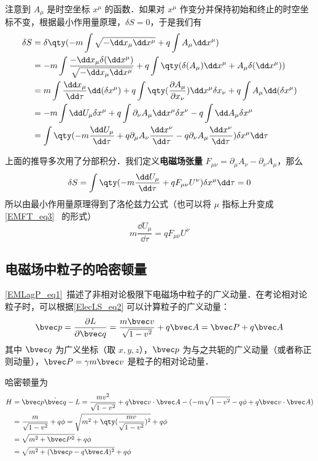 注意到 $A_\mu$ 是时空坐标 $x^\mu$ 的函数．如果对 $x^\mu$ 作变分并保持初始和终止的时空坐标不变，根据最小作用量原理，$\delta S=0$，于是我们有
\begin{equation}
\begin{aligned}
\delta S&=\delta\qty( -m\int \sqrt{-\dd x_\mu \dd x^\mu} +q\int A_\mu \dd x^\mu)\\
&=-m\int \frac{-\dd x_\mu \delta (\dd x^\mu)}{\sqrt{-\dd x_\mu \dd x^\mu}}+q\int \qty(\delta(A_\mu)\dd x^\mu + A_\mu \delta(\dd x^\mu))\\
&=m\int \frac{\dd x_\mu}{\dd \tau}\dd(\delta x^\mu)+q\int\qty(\frac{\partial A_\mu}{\partial x_\nu})\dd x^\mu \delta x_\nu+q\int A_\mu \dd(\delta x^\mu)\\
&=-m\int\dd U_\mu \delta x^\mu+q\int \partial_\nu A_\mu \dd x^\mu\delta x^\nu-q\int \dd A_\mu \delta x^\mu\\
&=\int \qty(-m\frac{\dd U_\mu}{\dd \tau} + q\partial_\mu A_\nu \frac{\dd x^\nu}{\dd \tau}-q\partial_\nu A_\mu\frac{\dd x^\nu}{\dd \tau})\delta x^\mu\dd \tau\\
\end{aligned}
\end{equation}

上面的推导多次用了分部积分．我们定义\textbf{电磁场张量} $F_{\mu\nu}=\partial_{\mu}A_\nu-\partial_\nu A_\mu$，那么
\begin{equation}
\delta S=\int\qty(-m\frac{\dd U_\mu}{\dd \tau}+qF_{\mu\nu}U^\nu)\delta x^\mu \dd \tau=0
\end{equation}
所以由最小作用量原理得到了洛伦兹力公式（也可以将 $\mu$ 指标上升变成 \autoref{EMFT_eq3}~ 的形式）
\begin{equation}
m\frac{\dd U_\mu}{\dd \tau}=qF_{\mu\nu} U^\nu
\end{equation}

\subsection{电磁场中粒子的哈密顿量}
\autoref{EMLagP_eq1}~描述了非相对论极限下电磁场中粒子的广义动量．在考论相对论粒子时，可以根据\autoref{ElecLS_eq2} 可以计算粒子的广义动量：
\begin{equation}
\bvec p=\frac{\partial L}{\partial \dot {\bvec q}}=\frac{m\bvec v}{\sqrt{1-v^2}}+q\bvec A=\bvec P+q\bvec A
\end{equation}
其中 $\bvec q$ 为广义坐标（取 $x,y,z$），$\bvec p$ 为与之共轭的广义动量（或者称正则动量），$\bvec P=\gamma m\bvec v$ 是粒子的相对论动量．

哈密顿量为
\begin{equation}
\begin{aligned}
H&=\bvec p \dot{\bvec q}-L=\frac{mv^2}{\sqrt{1-v^2}}+q\bvec v\cdot \bvec A-(-m\sqrt{1-v^2}-q\phi+q\bvec v\cdot \bvec A)\\
&=\frac{m}{\sqrt{1-v^2}}+q\phi=\sqrt{m^2+\qty(\frac{mv}{\sqrt{1-v^2}})^2}+q\phi\\
&=\sqrt{m^2+\bvec P^2}+q\phi\\
&=\sqrt{m^2+(\bvec p-q\bvec A)^2}+q\phi
\end{aligned}
\end{equation}